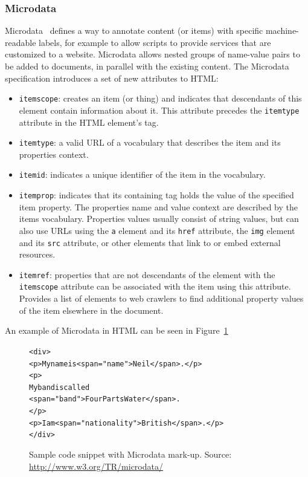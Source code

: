 \documentclass[12pt]{article}
\newenvironment{code}[1]
{\begin{lrbox}{\inverbatim}\begin{minipage}{13.5cm}\begin{alltt}{#1}}
{\end{alltt}\end{minipage}\end{lrbox}\colorbox{lightgray}{\usebox{\inverbatim}}}
\begin{document}
\subsubsection{Microdata}
Microdata~\cite{Hickson:Microdata10} defines a way to annotate content (or items) with specific machine-readable labels, for example to allow scripts to provide services that are customized to a website. Microdata allows nested groups of name-value pairs to be added to documents, in parallel with the existing content. The Microdata specification introduces a set of new attributes to HTML:
\begin{itemize}
\item \texttt{itemscope}: creates an item (or thing) and indicates that descendants of this element contain information about it. This attribute precedes the \texttt{itemtype} attribute in the HTML element’s tag.
\item \texttt{itemtype}: a valid URL of a vocabulary that describes the item and its properties context.
\item \texttt{itemid}: indicates a unique identifier of the item in the vocabulary.
\item \texttt{itemprop}: indicates that its containing tag holds the value of the specified item property. The properties name and value context are described by the items vocabulary. Properties values usually consist of string values, but can also use URLs using the \texttt{a} element and its \texttt{href} attribute, the \texttt{img} element and its \texttt{src} attribute, or other elements that link to or embed external resources.
\item \texttt{itemref}: properties that are not descendants of the element with the \texttt{itemscope} attribute can be associated with the item using this attribute. Provides a list of elements to web crawlers to find additional property values of the item elsewhere in the document.
\end{itemize}

An example of Microdata in HTML can be seen in Figure~\ref{code:microdata}

\begin{figure}[htbp!]
\begin{center}
{\footnotesize
\begin{code}
<div >
  <p>My name is <span ="name">Neil</span>.</p>
  <p>
    My band is called
    <span ="band">Four Parts Water</span>.
  </p>
  <p>I am <span ="nationality">British</span>.</p>
</div>
\end{code}}
  \caption[Sample code snippet with  mark-up.]{Sample code snippet with Microdata mark-up. Source: \url{http://www.w3.org/TR/microdata/}}
  \label{code:microdata} 
\end{center}    
\end{figure}
\end{document}
